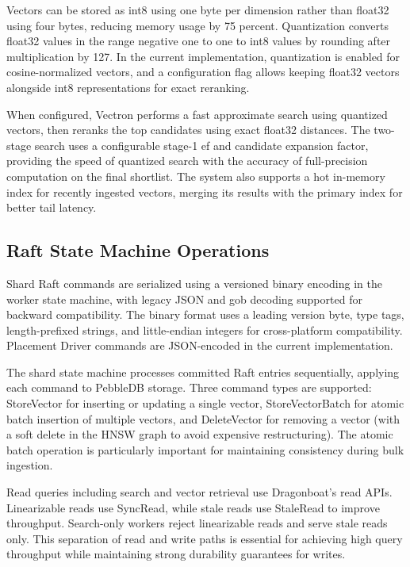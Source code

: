 \documentclass[conference]{IEEEtran}
\begin{document}
Vectors can be stored as int8 using one byte per dimension rather than float32 using four bytes, reducing memory usage by 75 percent. Quantization converts float32 values in the range negative one to one to int8 values by rounding after multiplication by 127. In the current implementation, quantization is enabled for cosine-normalized vectors, and a configuration flag allows keeping float32 vectors alongside int8 representations for exact reranking.

When configured, Vectron performs a fast approximate search using quantized vectors, then reranks the top candidates using exact float32 distances. The two-stage search uses a configurable stage-1 ef and candidate expansion factor, providing the speed of quantized search with the accuracy of full-precision computation on the final shortlist. The system also supports a hot in-memory index for recently ingested vectors, merging its results with the primary index for better tail latency.

\subsection{Raft State Machine Operations}

Shard Raft commands are serialized using a versioned binary encoding in the worker state machine, with legacy JSON and gob decoding supported for backward compatibility. The binary format uses a leading version byte, type tags, length-prefixed strings, and little-endian integers for cross-platform compatibility. Placement Driver commands are JSON-encoded in the current implementation.

The shard state machine processes committed Raft entries sequentially, applying each command to PebbleDB storage. Three command types are supported: StoreVector for inserting or updating a single vector, StoreVectorBatch for atomic batch insertion of multiple vectors, and DeleteVector for removing a vector (with a soft delete in the HNSW graph to avoid expensive restructuring). The atomic batch operation is particularly important for maintaining consistency during bulk ingestion.

Read queries including search and vector retrieval use Dragonboat's read APIs. Linearizable reads use SyncRead, while stale reads use StaleRead to improve throughput. Search-only workers reject linearizable reads and serve stale reads only. This separation of read and write paths is essential for achieving high query throughput while maintaining strong durability guarantees for writes.
\end{document}
